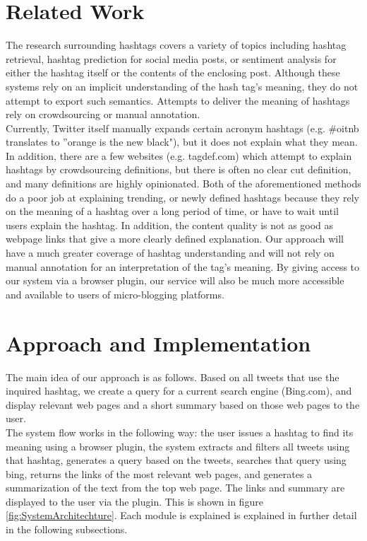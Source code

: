 \documentclass{sig-alternate}
\begin{document}
\section{Related Work}
\label{sec:relatedWork}
The research surrounding hashtags covers a variety of topics including hashtag retrieval\cite{efron:retrieval}, hashtag prediction\cite{khabiri:predict}\cite{tagspace} for social media posts, or sentiment analysis for either the hashtag itself or the contents of the enclosing post.  Although these systems rely on an implicit understanding of the hash tag's meaning, they do not attempt to export such semantics.  Attempts to deliver the meaning of hashtags rely on crowdsourcing or manual annotation.\\
Currently, Twitter itself manually expands certain acronym hashtags (e.g. \#oitnb translates to ''orange is the new black"), but it does not explain what they mean. In addition, there are a few websites (e.g. tagdef.com) which attempt to explain hashtags by crowdsourcing definitions, but there is often no clear cut definition, and many definitions are highly opinionated. Both of the aforementioned methods do a poor job at explaining trending, or newly defined hashtags because they rely on the meaning of a hashtag over a long period of time, or have to wait until users explain the hashtag. In addition, the content quality is not as good as webpage links that give a more clearly defined explanation.
Our approach will have a much greater coverage of hashtag understanding and will not rely on manual annotation for an interpretation of the tag's meaning.  By giving access to our system via a browser plugin, our service will also be much more accessible and available to users of micro-blogging platforms.\\

\section{Approach and Implementation}
\label{sec:implementation}
The main idea of our approach is as follows. Based on all tweets that use the inquired hashtag, we create a query for a current search engine (Bing.com), and display relevant web pages and a short summary based on those web pages to the user. \\
The system flow works in the following way: the user issues a hashtag to find its meaning using a browser plugin, the system extracts and filters all tweets using that hashtag, generates a query based on the tweets, searches that query using bing, returns the links of the most relevant web pages, and generates a summarization of the text from the top web page. The links and summary are displayed to the user via the plugin. This is shown in figure \ref{fig:SystemArchitechture}. Each module is explained is explained in further detail in the following subsections.
\end{document}
